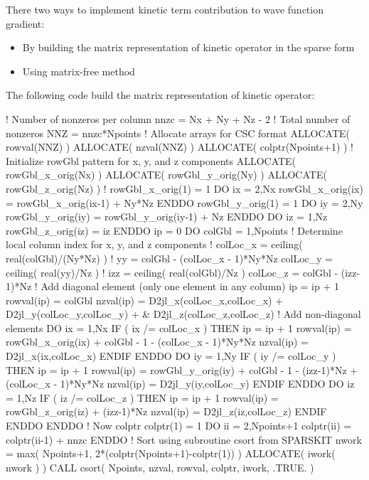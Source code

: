 There two ways to implement kinetic term contribution to wave function
gradient:
\begin{itemize}
\item By building the matrix representation of kinetic operator in the
sparse form
\item Using matrix-free method
\end{itemize}

The following code build the matrix representation of kinetic operator:
\begin{fortrancode}
! Number of nonzeros per column
nnzc = Nx + Ny + Nz - 2
! Total number of nonzeros
NNZ  = nnzc*Npoints
! Allocate arrays for CSC format
ALLOCATE( rowval(NNZ) )
ALLOCATE( nzval(NNZ) )
ALLOCATE( colptr(Npoints+1) )
! Initialize rowGbl pattern for x, y, and z components
ALLOCATE( rowGbl_x_orig(Nx) )
ALLOCATE( rowGbl_y_orig(Ny) )
ALLOCATE( rowGbl_z_orig(Nz) )
!
rowGbl_x_orig(1) = 1
DO ix = 2,Nx
  rowGbl_x_orig(ix) = rowGbl_x_orig(ix-1) + Ny*Nz
ENDDO 
rowGbl_y_orig(1) = 1
DO iy = 2,Ny
  rowGbl_y_orig(iy) = rowGbl_y_orig(iy-1) + Nz
ENDDO 
DO iz = 1,Nz
  rowGbl_z_orig(iz) = iz
ENDDO 
ip = 0
DO colGbl = 1,Npoints
  ! Determine local column index for x, y, and z components
  !
  colLoc_x = ceiling( real(colGbl)/(Ny*Nz) )
  !
  yy = colGbl - (colLoc_x - 1)*Ny*Nz
  colLoc_y = ceiling( real(yy)/Nz )
  !
  izz = ceiling( real(colGbl)/Nz )
  colLoc_z = colGbl - (izz-1)*Nz
  ! Add diagonal element (only one element in any column)
  ip = ip + 1
  rowval(ip) = colGbl
  nzval(ip) = D2jl_x(colLoc_x,colLoc_x) + D2jl_y(colLoc_y,colLoc_y) + &
              D2jl_z(colLoc_z,colLoc_z)
  ! Add non-diagonal elements
  DO ix = 1,Nx
    IF ( ix /= colLoc_x ) THEN 
      ip = ip + 1
      rowval(ip) = rowGbl_x_orig(ix) + colGbl - 1 - (colLoc_x - 1)*Ny*Nz
      nzval(ip) = D2jl_x(ix,colLoc_x)
    ENDIF 
  ENDDO 
  DO iy = 1,Ny
    IF ( iy /= colLoc_y ) THEN 
      ip = ip + 1
      rowval(ip) = rowGbl_y_orig(iy) + colGbl - 1 - (izz-1)*Nz + (colLoc_x - 1)*Ny*Nz
      nzval(ip) = D2jl_y(iy,colLoc_y)
    ENDIF 
  ENDDO 
  DO iz = 1,Nz
    IF ( iz /= colLoc_z ) THEN 
      ip = ip + 1
      rowval(ip) = rowGbl_z_orig(iz) + (izz-1)*Nz
      nzval(ip) = D2jl_z(iz,colLoc_z)
    ENDIF 
  ENDDO 
ENDDO 
! Now colptr
colptr(1) = 1
DO ii = 2,Npoints+1
  colptr(ii) = colptr(ii-1) + nnzc
ENDDO 
! Sort using subroutine csort from SPARSKIT
nwork = max( Npoints+1, 2*(colptr(Npoints+1)-colptr(1)) )
ALLOCATE( iwork( nwork ) )
CALL csort( Npoints, nzval, rowval, colptr, iwork, .TRUE. )
\end{fortrancode}

